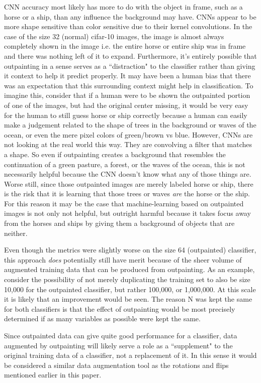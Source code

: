 \documentclass[conference]{IEEEtran}
\begin{document}
CNN accuracy most likely has more to do with the object in frame, such as a horse or a ship, than any influence the background may have. CNNs appear to be more shape sensitive than color sensitive due to their kernel convolutions. In the case of the size 32 (normal) cifar-10 images, the image is almost always completely shown in the image i.e. the entire horse or entire ship was in frame and there was nothing left of it to expand. Furthermore, it's entirely possible that outpainting in a sense serves as a ``distraction" to the classifier rather than giving it context to help it predict properly. It may have been a human bias that there was an expectation that this surrounding context might help in classification. To imagine this, consider that if a human were to be shown the outpainted portion of one of the images, but had the original center missing, it would be very easy for the human to still guess horse or ship correctly because a human can easily make a judgement related to the shape of trees in the background or waves of the ocean, or even the mere pixel colors of green/brown vs blue. However, CNNs are not looking at the real world this way. They are convolving a filter that matches a shape. So even if outpainting creates a background that resembles the continuation of a green pasture, a forest, or the waves of the ocean, this is not necessarily helpful because the CNN doesn't know what any of those things are. Worse still, since those outpainted images are merely labeled horse or ship, there is the risk that it is learning that those trees or waves \emph{are} the horse or the ship. For this reason it may be the case that machine-learning based on outpainted images is not only not helpful, but outright harmful because it takes focus away from the horses and ships by giving them a background of objects that are neither.

Even though the metrics were slightly worse on the size 64 (outpainted) classifier, this approach \emph{does} potentially still have merit because of the sheer volume of augmented training data that can be produced from outpainting. As an example, consider the possibility of not merely duplicating the training set to also be size 10,000 for the outpainted classifier, but rather 100,000, or 1,000,000. At this scale it is likely that an improvement would be seen. The reason N was kept the same for both classifiers is that the effect of outpainting would be most precisely determined if as many variables as possible were kept the same.

Since outpainted data can give quite good performance for a classifier, data augmented by outpainting will likely serve a role as a ``supplement" to the original training data of a classifier, not a replacement of it. In this sense it would be considered a similar data augmentation tool as the rotations and flips mentioned earlier in this paper.
\end{document}
